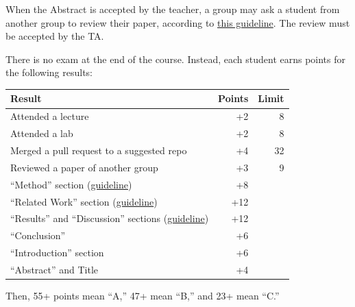 \documentclass[nobrand,anonymous,nodate,nosecurity]{huawei}
\begin{document}
{When the Abstract is accepted by the teacher, a group may ask a student from another
group to review their paper, according to
\href{https://www.yegor256.com/2023/12/17/how-to-review-research-paper.html}{this guideline}.
The review must be accepted by the TA.

There is no exam at the end of the course. Instead,
each student earns points for the following results:\\
\renewcommand{\arraystretch}{1}
\begin{tabular}{lrr}
Result & Points & Limit \\
\hline
Attended a lecture & +2 & 8 \\
Attended a lab & +2 & 8 \\
Merged a pull request to a suggested repo & +4 & 32 \\
Reviewed a paper of another group & +3 & 9 \\
``Method'' section (\href{https://www.yegor256.com/2023/10/11/method-of-research.html}{guideline}) & +8 \\
``Related Work'' section (\href{https://www.yegor256.com/2023/09/29/how-to-write-related-work-section.html}{guideline}) & +12 \\
``Results'' and ``Discussion'' sections (\href{https://www.yegor256.com/2023/12/11/results-and-discussion.html}{guideline}) & +12 \\
``Conclusion'' & +6 \\
``Introduction'' section & +6 \\
``Abstract'' and Title & +4 \\
\end{tabular}

Then, 55+ points mean ``A,'' 47+ mean ``B,'' and 23+ mean ``C.''



}
\end{document}
